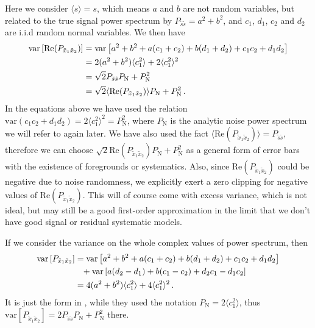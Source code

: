 \documentclass[12pt,a4paper]{article}
\begin{document}
Here we consider $\langle s \rangle = s$, which means $a$ and $b$ are not random variables, but related to the true signal power spectrum by $P_{\tilde{s}\tilde{s}} = a^2 +b^2$, and $c_1$, $d_1$, $c_2$ and $d_2$ are i.i.d random normal variables. We then have
\begin{align}
\label{eq:var_real_ps}
\text{var} \left[\text{Re} (P_{\tilde{x}_1\tilde{x}_2}) \right] &= \text{var} \left[a^2+b^2 + a(c_1+c_2) + b(d_1+d_2) + c_1c_2 + d_1d_2 \right] \notag \\
& = 2(a^2+b^2)\langle c_1^2\rangle + 2\langle c_1^2\rangle^2 \notag \\
& = \sqrt{2}P_{\tilde{s}\tilde{s}}P_\text{N} + P_\text{N}^2 \notag \\
& = \sqrt{2}\langle \text{Re} (P_{\tilde{x}_1\tilde{x}_2})\rangle P_\text{N} + P_\text{N}^2 \,.
\end{align}
In the equations above we have used the relation $\text{var} ( c_1c_2 + d_1d_2) = 2\langle c_1^2\rangle^2 = P_\text{N}^2$, where $P_\text{N}$ is the analytic noise power spectrum we will refer to again later. We have also used the fact $\langle \text{Re} (P_{\tilde{x}_1\tilde{x}_2})\rangle = P_{\tilde{s}\tilde{s}}$, therefore we can choose $\sqrt{2}\text{Re} (P_{\tilde{x}_1\tilde{x}_2}) P_\text{N} + P_\text{N}^2$ as a general form of error bars with the existence of foregrounds or systematics. Also, since $\text{Re} (P_{\tilde{x}_1\tilde{x}_2})$ could be negative due to noise randomness, we explicitly exert a zero clipping for negative values of $\text{Re} (P_{\tilde{x}_1\tilde{x}_2})$. This will of course come with excess variance, which is not ideal, but may still be a good first-order approximation in the limit that we don't have good signal or residual systematic models.

If we consider the variance on the whole complex values of power spectrum, then
\begin{align}
\label{eq:var_ps}
\text{var} \left[P_{\tilde{x}_1\tilde{x}_2} \right] &= \text{var} \left[a^2+b^2 + a(c_1+c_2) + b(d_1+d_2) + c_1c_2 + d_1d_2 \right] \notag \\
&\phantom{=} +  \text{var} \left[a(d_2-d_1)+b(c_1-c_2)+d_2 c_1-d_1 c_2 \right] \notag \\
& = 4(a^2+b^2)\langle c_1^2\rangle + 4\langle c_1^2\rangle^2 \,.
\end{align}
It is just the form in \citet{kolopanis2019simplified}, while they used the notation $P_\text{N} = 2\langle c_1^2\rangle$, thus $\text{var} \left[P_{\tilde{x}_1\tilde{x}_2} \right] = 2 P_{\tilde{s}\tilde{s}} P_\text{N} + P_\text{N}^2$ there.
\end{document}
